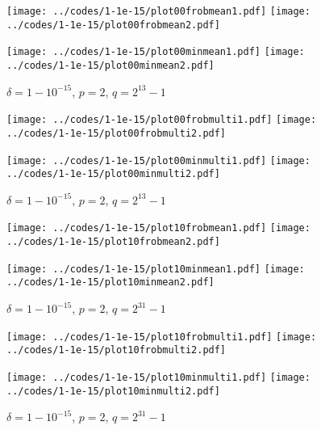 \documentclass{article}
\begin{document}
\begin{figure}
\begin{centering}
{\texttt{[image: ../codes/1-1e-15/plot00frobmean1.pdf]}}
{\texttt{[image: ../codes/1-1e-15/plot00frobmean2.pdf]}}

{\texttt{[image: ../codes/1-1e-15/plot00minmean1.pdf]}}
{\texttt{[image: ../codes/1-1e-15/plot00minmean2.pdf]}}

\end{centering}
\caption{$\delta = 1-10^{-15}$, $p = 2$, $q = 2^{13} - 1$}
\label{p2err1-1e-15-13once}
\end{figure}

\begin{figure}
\begin{centering}
{\texttt{[image: ../codes/1-1e-15/plot00frobmulti1.pdf]}}
{\texttt{[image: ../codes/1-1e-15/plot00frobmulti2.pdf]}}

{\texttt{[image: ../codes/1-1e-15/plot00minmulti1.pdf]}}
{\texttt{[image: ../codes/1-1e-15/plot00minmulti2.pdf]}}

\end{centering}
\caption{$\delta = 1-10^{-15}$, $p = 2$, $q = 2^{13} - 1$}
\end{figure}

\begin{figure}
\begin{centering}
{\texttt{[image: ../codes/1-1e-15/plot10frobmean1.pdf]}}
{\texttt{[image: ../codes/1-1e-15/plot10frobmean2.pdf]}}

{\texttt{[image: ../codes/1-1e-15/plot10minmean1.pdf]}}
{\texttt{[image: ../codes/1-1e-15/plot10minmean2.pdf]}}

\end{centering}
\caption{$\delta = 1-10^{-15}$, $p = 2$, $q = 2^{31} - 1$}
\end{figure}

\begin{figure}
\begin{centering}
{\texttt{[image: ../codes/1-1e-15/plot10frobmulti1.pdf]}}
{\texttt{[image: ../codes/1-1e-15/plot10frobmulti2.pdf]}}

{\texttt{[image: ../codes/1-1e-15/plot10minmulti1.pdf]}}
{\texttt{[image: ../codes/1-1e-15/plot10minmulti2.pdf]}}

\end{centering}
\caption{$\delta = 1-10^{-15}$, $p = 2$, $q = 2^{31} - 1$}
\label{p2err1-1e-15-31}
\end{figure}
\end{document}
